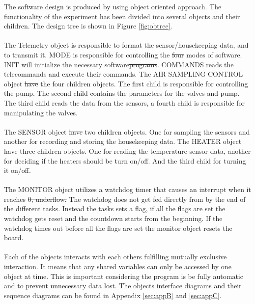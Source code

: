 \documentclass[a4paper,12pt,oneside]{article} %
\providecommand{\DIFaddtex}[1]{{\protect\color{blue}\uwave{#1}}} %
\providecommand{\DIFdeltex}[1]{{\protect\color{red}\sout{#1}}}                      %
\providecommand{\DIFaddbegin}{} %
\providecommand{\DIFaddend}{} %
\providecommand{\DIFdelbegin}{} %
\providecommand{\DIFdelend}{} %
\providecommand{\DIFadd}[1]{\texorpdfstring{\DIFaddtex{#1}}{#1}} %
\providecommand{\DIFdel}[1]{\texorpdfstring{\DIFdeltex{#1}}{}} %
\newcommand{\DIFscaledelfig}{0.5}
\newlength{\DIFdelgraphicswidth} %
\newlength{\DIFdelgraphicsheight} %
\newcommand{\DIFaddincludegraphics}[2][]{{\color{blue}\fbox{\DIFOincludegraphics[#1]{#2}}}} %
\newcommand{\DIFdelincludegraphics}[2][]{%
\sbox{\DIFdelgraphicsbox}{\DIFOincludegraphics[#1]{#2}}%
\settoboxwidth{\DIFdelgraphicswidth}{\DIFdelgraphicsbox} %
\settoboxtotalheight{\DIFdelgraphicsheight}{\DIFdelgraphicsbox} %
\scalebox{\DIFscaledelfig}{%
\parbox[b]{\DIFdelgraphicswidth}{\usebox{\DIFdelgraphicsbox}\\[-\baselineskip] \rule{\DIFdelgraphicswidth}{0em}}\llap{\resizebox{\DIFdelgraphicswidth}{\DIFdelgraphicsheight}{%
\setlength{\unitlength}{\DIFdelgraphicswidth}%
\begin{picture}(1,1)%
\thicklines\linethickness{2pt} %
{\color[rgb]{1,0,0}\put(0,0){\framebox(1,1){}}}%
{\color[rgb]{1,0,0}\put(0,0){\line( 1,1){1}}}%
{\color[rgb]{1,0,0}\put(0,1){\line(1,-1){1}}}%
\end{picture}%
}\hspace*{3pt}}} %
} %
\DeclareRobustCommand{\DIFaddbegin}{\DIFOaddbegin \let\includegraphics\DIFaddincludegraphics} %
\DeclareRobustCommand{\DIFaddend}{\DIFOaddend \let\includegraphics\DIFOincludegraphics} %
\DeclareRobustCommand{\DIFdelbegin}{\DIFOdelbegin \let\includegraphics\DIFdelincludegraphics} %
\DeclareRobustCommand{\DIFdelend}{\DIFOaddend \let\includegraphics\DIFOincludegraphics} %
\begin{document}
\begin{enumerate}[label=(\alph*)]
The software design is produced by using object oriented approach. The functionality of the experiment has been divided into several objects and their children. The design tree is shown in Figure \ref{fig:obtree}.\\
\\
The Telemetry object is responsible to format the sensor/housekeeping data, and to transmit it. MODE is responsible for controlling the \DIFdelbegin \DIFdel{four }\DIFdelend \DIFaddbegin \DIFadd{five }\DIFaddend modes of software. INIT will initialize the necessary software\DIFdelbegin \DIFdel{programs}\DIFdelend . COMMANDS reads the telecommands and execute their commands. The AIR SAMPLING CONTROL object \DIFdelbegin \DIFdel{have }\DIFdelend \DIFaddbegin \DIFadd{has }\DIFaddend the four children objects. The first child is responsible for controlling the pump. The second child contains the parameters for the valves and pump. The third child reads the data from the sensors, a fourth child is responsible for manipulating the valves.\\
\\
The SENSOR object \DIFdelbegin \DIFdel{have }\DIFdelend \DIFaddbegin \DIFadd{has }\DIFaddend two children objects. One for sampling the sensors and another for recording and storing the housekeeping data. The HEATER object \DIFdelbegin \DIFdel{have }\DIFdelend \DIFaddbegin \DIFadd{has }\DIFaddend three children objects. One for reading the temperature sensor data, another for deciding if the heaters should be turn on/off. And the third child for turning it on/off.\\ 
\\
The MONITOR object utilizes a watchdog timer that causes an interrupt when it reaches \DIFdelbegin \DIFdel{0, underflow. }\DIFdelend \DIFaddbegin \DIFadd{0. }\DIFaddend The watchdog does not get fed directly from by the end of the different tasks. Instead the tasks sets a flag, if all the flags are set the watchdog gets reset and the countdown starts from the beginning. If the watchdog times out before all the flags are set the monitor object resets the board.\\
\\
Each of the objects interacts with each others fulfilling mutually exclusive interaction. It means that any shared variables can only be accessed by one object at time. This is important considering the program is be fully automatic and to prevent unnecessary data lost. The objects interface diagrams and their sequence diagrams can be found in Appendix \ref{sec:appB} and \ref{sec:appC}.
\end{enumerate}
\end{document}
